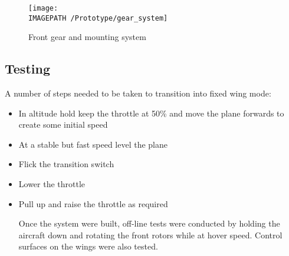 \begin{figure}[!ht]
	\centering
	\texttt{[image: \\IMAGEPATH /Prototype/gear\_system]}
	\caption{Front gear and mounting system}
	\label{fig:gearsys}
\end{figure}

\subsection{Testing}
A number of steps needed to be taken to transition into fixed wing mode: 

\begin{itemize}
\item In altitude hold keep the throttle at 50\% and move the plane forwards to create some initial speed
\item At a stable but fast speed level the plane
\item Flick the transition switch 
\item Lower the throttle
\item Pull up and raise the throttle as required

Once the system were built, off-line tests were conducted by holding the aircraft down and rotating the front rotors while at hover speed. Control surfaces on the wings were also tested. 

		
\end{itemize}

